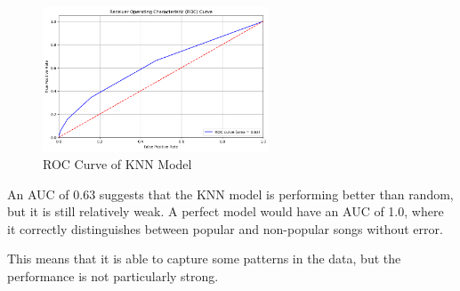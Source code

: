 \begin{figure} [H]
    \centering
    \includegraphics[width=0.6\textwidth]{media/roc_curve.png}
    \caption{ROC Curve of KNN Model}
    \label{fig:knn_roc_curve}
\end{figure}

An AUC of 0.63 suggests that the KNN model is performing better than random, but it is still relatively weak.
A perfect model would have an AUC of 1.0, where it correctly distinguishes between popular and non-popular songs without error.

This means that it is able to capture some patterns in the data, but the performance is not particularly strong. 